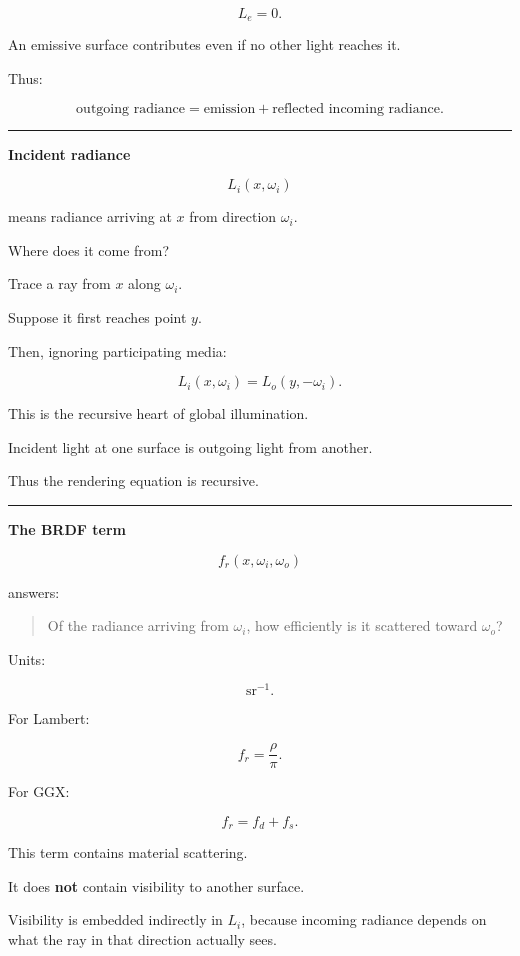 \[
L_e=0.
\]

An emissive surface contributes even if no other light reaches it.

Thus:

\[
\boxed{
\text{outgoing radiance}
=
\text{emission}
+
\text{reflected incoming radiance}.
}
\]

\begin{center}\rule{0.5\linewidth}{0.5pt}\end{center}

\textbf{Incident radiance}

\[
L_i(x,\omega_i)
\]

means radiance arriving at \(x\) from direction \(\omega_i\).

Where does it come from?

Trace a ray from \(x\) along \(\omega_i\).

Suppose it first reaches point \(y\).

Then, ignoring participating media:

\[
\boxed{
L_i(x,\omega_i)
=
L_o(y,-\omega_i).
}
\]

This is the recursive heart of global illumination.

Incident light at one surface is outgoing light from another.

Thus the rendering equation is recursive.

\begin{center}\rule{0.5\linewidth}{0.5pt}\end{center}

\textbf{The BRDF term}

\[
f_r(x,\omega_i,\omega_o)
\]

answers:

\begin{quote}
Of the radiance arriving from \(\omega_i\), how efficiently is it scattered toward \(\omega_o\)?
\end{quote}

Units:

\[
\mathrm{sr}^{-1}.
\]

For Lambert:

\[
f_r=
\frac{\rho}{\pi}.
\]

For GGX:

\[
f_r=
f_d+
f_s.
\]

This term contains material scattering.

It does \textbf{not} contain visibility to another surface.

Visibility is embedded indirectly in \(L_i\), because incoming radiance depends on what the ray in that direction actually sees.

